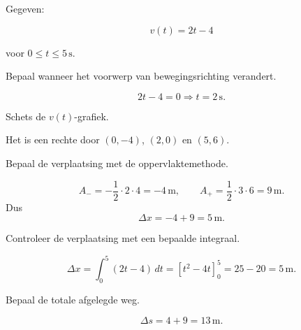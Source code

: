 \documentclass{ximera}
\begin{document}
\begin{oefening}{\oefU\ESS}

Gegeven:

\[v(t)=2t-4\]

voor $0\leq t\leq5\,\mathrm{s}$.

\begin{question}

Bepaal wanneer het voorwerp van bewegingsrichting verandert.

\begin{oplossing}
\[2t-4=0\Longrightarrow t=2\,\mathrm{s}.\]
\end{oplossing}

\end{question}

\begin{question}

Schets de $v(t)$-grafiek.

\begin{oplossing}
Het is een rechte door \((0,-4)\), \((2,0)\) en \((5,6)\).
\end{oplossing}

\end{question}

\begin{question}

Bepaal de verplaatsing met de oppervlaktemethode.

\begin{oplossing}
\[A_-=-\frac12\cdot2\cdot4=-4\,\mathrm{m}, \qquad A_+=\frac12\cdot3\cdot6=9\,\mathrm{m}.\]
Dus
\[\Delta x=-4+9=5\,\mathrm{m}.\]
\end{oplossing}

\end{question}

\begin{question}

Controleer de verplaatsing met een bepaalde integraal.

\begin{oplossing}
\[\Delta x=\int_0^5(2t-4)\,dt =\left[t^2-4t\right]_0^5=25-20=5\,\mathrm{m}.\]
\end{oplossing}

\end{question}

\begin{question}

Bepaal de totale afgelegde weg.

\begin{oplossing}
\[\Delta s=4+9=13\,\mathrm{m}.\]
\end{oplossing}

\end{question}

\end{oefening}
\end{document}
